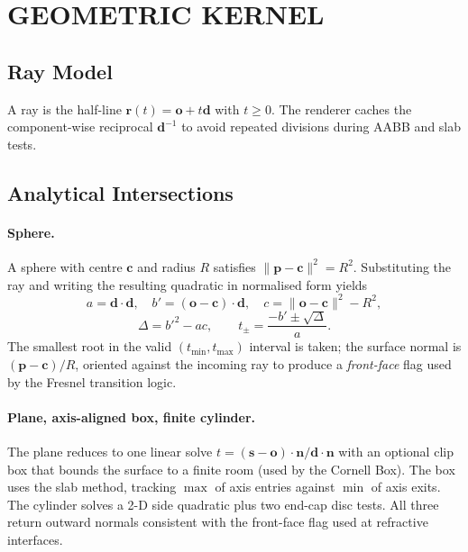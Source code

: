 \documentclass[twocolumn,10pt,cleanhead,cleanfoot]{asme2e}
\begin{document}
\section*{GEOMETRIC KERNEL}

\subsection*{Ray Model}
A ray is the half-line $\mathbf{r}(t)=\mathbf{o}+t\mathbf{d}$ with $t\geq 0$. The renderer caches the component-wise reciprocal $\mathbf{d}^{-1}$ to avoid repeated divisions during AABB and slab tests.

\subsection*{Analytical Intersections}

\paragraph{Sphere.} A sphere with centre $\mathbf{c}$ and radius $R$ satisfies $\|\mathbf{p}-\mathbf{c}\|^2=R^2$. Substituting the ray and writing the resulting quadratic in normalised form yields
\begin{equation}
a=\mathbf{d}\!\cdot\!\mathbf{d},\quad b'=(\mathbf{o}-\mathbf{c})\!\cdot\!\mathbf{d},\quad c=\|\mathbf{o}-\mathbf{c}\|^2-R^2,
\label{eq:sphere-coef}
\end{equation}
\begin{equation}
\Delta = b'^2 - a c,\qquad t_{\pm}=\frac{-b'\pm\sqrt{\Delta}}{a}.
\label{eq:sphere-t}
\end{equation}
The smallest root in the valid $(t_{\min},t_{\max})$ interval is taken; the surface normal is $(\mathbf{p}-\mathbf{c})/R$, oriented against the incoming ray to produce a \emph{front-face} flag used by the Fresnel transition logic.

\paragraph{Plane, axis-aligned box, finite cylinder.} The plane reduces to one linear solve $t=(\mathbf{s}-\mathbf{o})\!\cdot\!\mathbf{n}/\mathbf{d}\!\cdot\!\mathbf{n}$ with an optional clip box that bounds the surface to a finite room (used by the Cornell Box). The box uses the slab method, tracking $\max$ of axis entries against $\min$ of axis exits. The cylinder solves a 2-D side quadratic plus two end-cap disc tests. All three return outward normals consistent with the front-face flag used at refractive interfaces.
\end{document}
